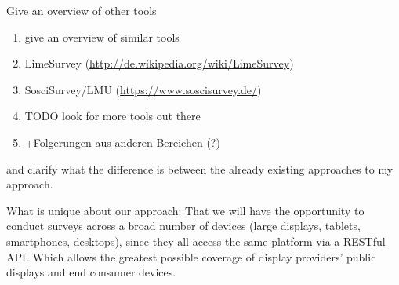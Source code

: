 	Give an overview of other tools 

	\begin{enumerate}
	\item give an overview of similar tools
	\item LimeSurvey (\url{http://de.wikipedia.org/wiki/LimeSurvey})
	\item SosciSurvey/LMU (\url{https://www.soscisurvey.de/})
	\item TODO look for more tools out there
	\item +Folgerungen aus anderen Bereichen (?)
	\end{enumerate}

	and clarify what the difference is between the already existing approaches to my approach.





What is unique about our approach: That we will have the opportunity to conduct surveys across a broad number of devices (large displays, tablets, smartphones, desktops), since they all access the same platform via a RESTful API. Which allows the greatest possible coverage of display providers' public displays and end consumer devices.
